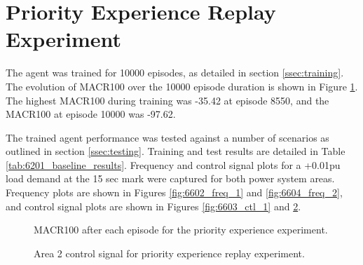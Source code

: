 \section{Priority Experience Replay Experiment}
The agent was trained for 10000 episodes, as detailed in section \ref{ssec:training}. The evolution of MACR100 over the 10000 episode duration is shown in Figure \ref{fig:6601_average_reward}. The highest MACR100 during training was -35.42 at episode 8550, and the MACR100 at episode 10000 was -97.62.

The trained agent performance was tested against a number of scenarios as outlined in section \ref{ssec:testing}. Training and test results are detailed in Table \ref{tab:6201_baseline_results}. Frequency and control signal plots for a +0.01pu load demand at the 15 sec mark were captured for both power system areas. Frequency plots are shown in Figures \ref{fig:6602_freq_1} and \ref{fig:6604_freq_2}, and control signal plots are shown in Figures \ref{fig:6603_ctl_1} and \ref{fig:6605_ctl_2}.

\vspace{2cm}

\begin{figure}[h]
	\centering
	
	\caption{MACR100 after each episode for the priority experience experiment.}\label{fig:6601_average_reward}
\end{figure}



\begin{figure}[h]
	\centering
	
	
	\vspace{-0.5cm}
	\caption{Area 1 frequency response for priority experience replay experiment.}\label{fig:6602_freq_1}
	
	\vspace{0.5cm}
	
	
	\vspace{-0.5cm}
	\caption{Area 1 control signal for priority experience replay experiment.}\label{fig:6603_ctl_1}
	
	\vspace{0.5cm}
	
	
	\vspace{-0.5cm}
	\caption{Area 2 frequency response for priority experience replay experiment.}\label{fig:6604_freq_2}
	
	\vspace{0.5cm}
		
	
	\vspace{-0.5cm}
	\caption{Area 2 control signal for priority experience replay experiment.}\label{fig:6605_ctl_2}
\end{figure}